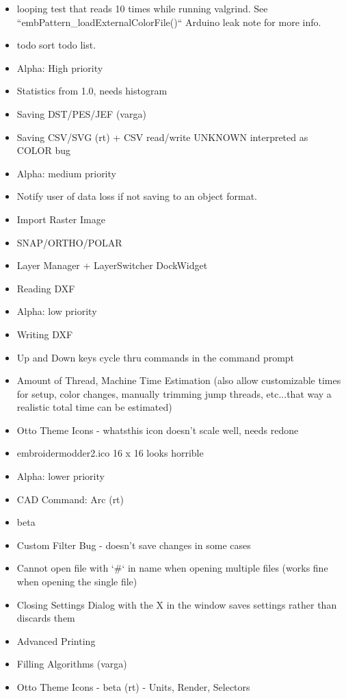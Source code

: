 \documentclass[11pt]{report}
\begin{document}
\begin{itemize}
\item looping test that reads 10 times while running valgrind. See ``embPattern\_loadExternalColorFile()`` Arduino leak note for more info.

\item todo sort todo list.
\item Alpha: High priority
  \item Statistics from 1.0, needs histogram
  \item Saving DST/PES/JEF (varga)
  \item Saving CSV/SVG (rt) + CSV read/write UNKNOWN interpreted as COLOR bug
\item Alpha: medium priority
  \item Notify user of data loss if not saving to an object format.
  \item Import Raster Image
  \item SNAP/ORTHO/POLAR
  \item Layer Manager + LayerSwitcher DockWidget
  \item Reading DXF
\item Alpha: low priority
  \item Writing DXF\item Up and Down keys cycle thru commands in the command prompt
  \item Amount of Thread, Machine Time Estimation (also allow customizable times for setup, color changes, manually trimming jump threads, etc...that way a realistic total time can be estimated)
  \item Otto Theme Icons - whatsthis icon doesn't scale well, needs redone
  \item embroidermodder2.ico 16 x 16 looks horrible
\item Alpha: lower priority
  \item CAD Command: Arc (rt)
\item beta
  \item Custom Filter Bug - doesn't save changes in some cases
  \item Cannot open file with `\#` in name when opening multiple files (works fine when opening the single file)
  \item Closing Settings Dialog with the X in the window saves settings rather than discards them
  \item Advanced Printing
  \item Filling Algorithms (varga)
  \item Otto Theme Icons - beta (rt) - Units, Render, Selectors

\end{itemize}
\end{document}
